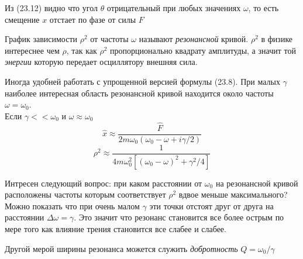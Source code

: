 \documentclass[12pt]{article}
\begin{document}
Из (23.12) видно что угол  \(\theta\) отрицательный при любых значениях \(\omega\), то есть смещение \(x\) отстает по фазе от силы \(F\)

График зависимости \(\rho^2\) от частоты \(\omega\) называют \textit{резонансной} кривой. \(\rho^2\) в физике интереснее чем \(\rho\), так как \(\rho^2\) пропорционально квадрату амплитуды, а значит той \textit{энергии} которую передает осциллятору внешняя сила.

Иногда удобней работать с упрощенной версией формулы (23.8). При малых \(\gamma\) наиболее интересная область резонансной кривой находится около частоты \(\omega=\omega_0\).\\
Если \(\gamma<<\omega_0\) и \(\omega \approx \omega_0\)
\[
    \hat{x} \approx \frac{\hat{F}}{2m\omega_0(\omega_0-\omega+i\gamma/2)}
\]
\[
    \rho^2 \approx \frac{1}{4m\omega_0^2[(\omega_0-\omega)^2+\gamma^2/4]}
\]

Интресен следующий вопрос: при каком расстоянии от \(\omega_0\) на резонансной кривой расположены частоты которым соответствует \(\rho^2\) вдвое меньше максимального? Можно показать что при очень малом \(\gamma\) эти точки отстоят друг от друга на расстоянии \(\Delta \omega = \gamma\). Это значит что резонанс становится все более острым по мере того как влияние трения становится все слабее и слабее.

Другой мерой ширины резонанса можется служить \textit{добротность} \(Q = \omega_0 / \gamma\)
\end{document}
